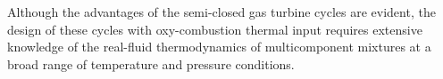 Although the advantages of the semi-closed  gas turbine cycles are evident, the design of these cycles with oxy-combustion thermal input requires extensive knowledge of the real-fluid thermodynamics of multicomponent mixtures at a broad range of temperature and pressure conditions.


